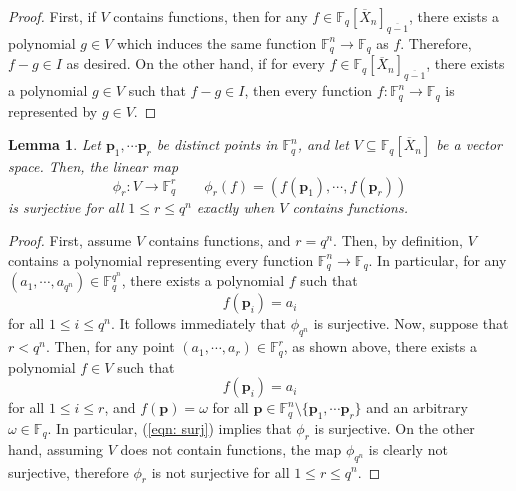 \documentclass[12pt]{amsart}
\newtheorem{lemma}[theorem]{Lemma}
\theoremstyle{definition}
\newcommand{\FF}{\mathbb{F} }
\newcommand{\bp}{\mathbf{p} }
\begin{document}
\begin{proof}
First, if $V$ contains functions, then for any $f \in \FF_q[\overline{X}_n]_{\overline{q-1}}$, there exists a polynomial $g \in V$ which induces the same function $\FF_q^n \to \FF_q$ as $f$. Therefore, $f-g \in I$ as desired. On the other hand, if for every $f \in \FF_q[\overline{X}_n]_{\overline{q-1}}$, there exists a polynomial $g \in V$ such that $f- g \in I$, then every function $f:\FF_q^n \to \FF_q$ is represented by $g \in V$.
\end{proof}


\begin{lemma}\label{lem: lem2}
Let $\bp_1, \cdots \bp_{r}$ be distinct points in $\FF_q^n$, and let $V \subseteq \FF_q[\overline{X}_n]$ be a vector space. Then, the linear map
\[
\phi_r: V \to \FF_q^{r} \qquad \phi_r(f) = (f(\bp_{1}), \cdots , f(\bp_{r}))
\]
is surjective for all $1 \le r \le q^n$ exactly when $V$ contains functions.
\end{lemma}

\begin{proof}
First, assume $V$ contains functions, and $r = q^n$. Then, by definition, $V$ contains a polynomial representing every function $\FF_q^n \to \FF_q$. In particular, for any $(a_1, \cdots , a_{q^n}) \in \FF_q^{q^n}$, there exists a polynomial $f$ such that
\[
f(\bp_i) = a_i
\]
for all $1 \le i \le q^n$. It follows immediately that $\phi_{q^n}$ is surjective. Now, suppose that $r < q^n$. Then, for any point $(a_1, \cdots , a_r) \in \FF_q^r$, as shown above, there exists a polynomial $f \in V$ such that
\begin{equation}\label{eqn: surj}
f(\bp_i) = a_i
\end{equation}
for all $1 \le i \le r$, and 
$
f(\bp) = \omega
$
for all $\bp \in \FF_q^n \setminus \{ \bp_1, \cdots \bp_{r} \}$ and an arbitrary $\omega \in \FF_q$. In particular, (\ref{eqn: surj}) implies that $\phi_r$ is surjective. On the other hand, assuming $V$ does not contain functions, the map $\phi_{q^n}$ is clearly not surjective, therefore $\phi_r$ is not surjective for all $1 \le r \le q^n$. 
\end{proof}
\end{document}
